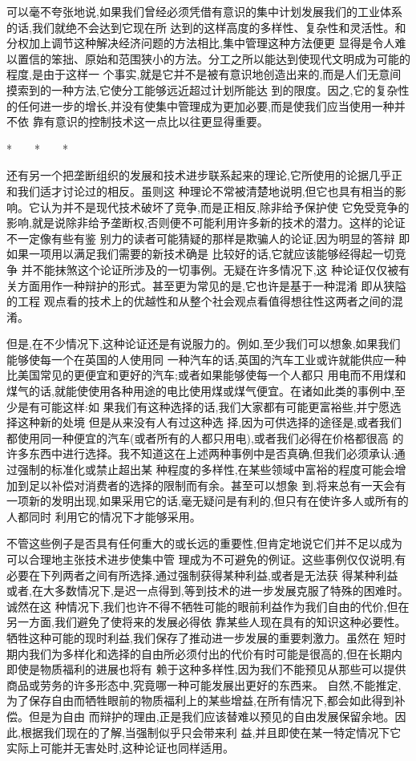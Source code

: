 ﻿\documentclass[12pt]{article}
\begin{document}
可以毫不夸张地说,如果我们曾经必须凭借有意识的集中计划发展我们的工业体系的话,我们就绝不会达到它现在所
达到的这样高度的多样性、复杂性和灵活性。和分权加上调节这种解决经济问题的方法相比,集中管理这种方法便更
显得是令人难以置信的笨拙、原始和范围狭小的方法。分工之所以能达到使现代文明成为可能的程度,是由于这样一
个事实,就是它并不是被有意识地创造出来的,而是人们无意间摸索到的一种方法,它使分工能够远近超过计划所能达
到的限度。因之,它的复杂性的任何进一步的增长,并没有使集中管理成为更加必要,而是使我们应当使用一种并不依
靠有意识的控制技术这一点比以往更显得重要。

*　　*　　*

还有另一个把垄断组织的发展和技术进步联系起来的理论,它所使用的论据几乎正和我们适才讨论过的相反。虽则这
种理论不常被清楚地说明,但它也具有相当的影响。它认为并不是现代技术破坏了竞争,而是正相反,除非给予保护使
它免受竞争的影响,就是说除非给予垄断权,否则便不可能利用许多新的技术的潜力。这样的论证不一定像有些有鉴
别力的读者可能猜疑的那样是欺骗人的论证,因为明显的答辩 \myrule 即如果一项用以满足我们需要的新技术确是
比较好的话,它就应该能够经得起一切竞争 \myrule 并不能抹煞这个论证所涉及的一切事例。无疑在许多情况下,这
种论证仅仅被有关方面用作一种辩护的形式。甚至更为常见的是,它也许是基于一种混淆 \myrule 即从狭隘的工程
观点看的技术上的优越性和从整个社会观点看值得想往性这两者之间的混淆。

但是,在不少情况下,这种论证还是有说服力的。例如,至少我们可以想象,如果我们能够使每一个在英国的人使用同
一种汽车的话,英国的汽车工业或许就能供应一种比美国常见的更便宜和更好的汽车;或者如果能够使每一个人都只
用电而不用煤和煤气的话,就能使使用各种用途的电比使用煤或煤气便宜。在诸如此类的事例中,至少是有可能这样:如
果我们有这种选择的话,我们大家都有可能更富裕些,并宁愿选择这种新的处境 \myrule 但是从来没有人有过这种选
择,因为可供选择的途径是,或者我们都使用同一种便宜的汽车(或者所有的人都只用电),或者我们必得在价格都很高
的许多东西中进行选择。我不知道这在上述两种事例中是否真确,但我们必须承认:通过强制的标准化或禁止超出某
种程度的多样性,在某些领域中富裕的程度可能会增加到足以补偿对消费者的选择的限制而有余。甚至可以想象
到,将来总有一天会有一项新的发明出现,如果采用它的话,毫无疑问是有利的,但只有在使许多人或所有的人都同时
利用它的情况下才能够采用。

不管这些例子是否具有任何重大的或长远的重要性,但肯定地说它们并不足以成为可以合理地主张技术进步使集中管
理成为不可避免的例证。这些事例仅仅说明,有必要在下列两者之间有所选择,通过强制获得某种利益,或者是无法获
得某种利益 \myrule 或者,在大多数情况下,是迟一点得到,等到技术的进一步发展克服了特殊的困难时。诚然在这
种情况下,我们也许不得不牺牲可能的眼前利益作为我们自由的代价,但在另一方面,我们避免了使将来的发展必得依
靠某些人现在具有的知识这种必要性。牺牲这种可能的现时利益,我们保存了推动进一步发展的重要刺激力。虽然在
短时期内我们为多样化和选择的自由所必须付出的代价有时可能是很高的,但在长期内即使是物质福利的进展也将有
赖于这种多样性,因为我们不能预见从那些可以提供商品或劳务的许多形态中,究竟哪一种可能发展出更好的东西来。
自然,不能推定,为了保存自由而牺牲眼前的物质福利上的某些增益,在所有情况下,都会如此得到补偿。但是为自由
而辩护的理由,正是我们应该替难以预见的自由发展保留余地。因此,根据我们现在的了解,当强制似乎只会带来利
益,并且即使在某一特定情况下它实际上可能并无害处时,这种论证也同样适用。
\end{document}
